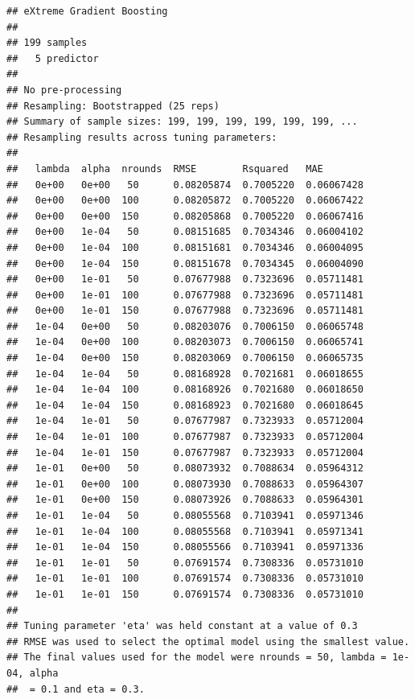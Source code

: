 \documentclass[11pt,]{article}
\newenvironment{Shaded}{\begin{snugshade}}{\end{snugshade}}
\newcommand{\NormalTok}[1]{#1}
\newcommand{\OperatorTok}[1]{\textcolor[rgb]{0.81,0.36,0.00}{\textbf{#1}}}
\begin{document}
\begin{verbatim}
## eXtreme Gradient Boosting 
## 
## 199 samples
##   5 predictor
## 
## No pre-processing
## Resampling: Bootstrapped (25 reps) 
## Summary of sample sizes: 199, 199, 199, 199, 199, 199, ... 
## Resampling results across tuning parameters:
## 
##   lambda  alpha  nrounds  RMSE        Rsquared   MAE       
##   0e+00   0e+00   50      0.08205874  0.7005220  0.06067428
##   0e+00   0e+00  100      0.08205872  0.7005220  0.06067422
##   0e+00   0e+00  150      0.08205868  0.7005220  0.06067416
##   0e+00   1e-04   50      0.08151685  0.7034346  0.06004102
##   0e+00   1e-04  100      0.08151681  0.7034346  0.06004095
##   0e+00   1e-04  150      0.08151678  0.7034345  0.06004090
##   0e+00   1e-01   50      0.07677988  0.7323696  0.05711481
##   0e+00   1e-01  100      0.07677988  0.7323696  0.05711481
##   0e+00   1e-01  150      0.07677988  0.7323696  0.05711481
##   1e-04   0e+00   50      0.08203076  0.7006150  0.06065748
##   1e-04   0e+00  100      0.08203073  0.7006150  0.06065741
##   1e-04   0e+00  150      0.08203069  0.7006150  0.06065735
##   1e-04   1e-04   50      0.08168928  0.7021681  0.06018655
##   1e-04   1e-04  100      0.08168926  0.7021680  0.06018650
##   1e-04   1e-04  150      0.08168923  0.7021680  0.06018645
##   1e-04   1e-01   50      0.07677987  0.7323933  0.05712004
##   1e-04   1e-01  100      0.07677987  0.7323933  0.05712004
##   1e-04   1e-01  150      0.07677987  0.7323933  0.05712004
##   1e-01   0e+00   50      0.08073932  0.7088634  0.05964312
##   1e-01   0e+00  100      0.08073930  0.7088633  0.05964307
##   1e-01   0e+00  150      0.08073926  0.7088633  0.05964301
##   1e-01   1e-04   50      0.08055568  0.7103941  0.05971346
##   1e-01   1e-04  100      0.08055568  0.7103941  0.05971341
##   1e-01   1e-04  150      0.08055566  0.7103941  0.05971336
##   1e-01   1e-01   50      0.07691574  0.7308336  0.05731010
##   1e-01   1e-01  100      0.07691574  0.7308336  0.05731010
##   1e-01   1e-01  150      0.07691574  0.7308336  0.05731010
## 
## Tuning parameter 'eta' was held constant at a value of 0.3
## RMSE was used to select the optimal model using the smallest value.
## The final values used for the model were nrounds = 50, lambda = 1e-04, alpha
##  = 0.1 and eta = 0.3.
\end{verbatim}

\begin{Shaded}
\end{Shaded}
\end{document}
